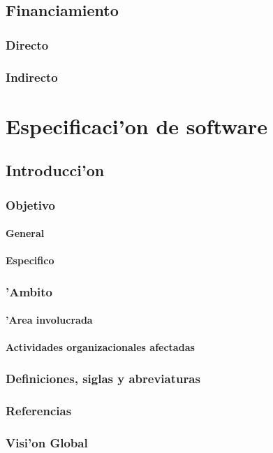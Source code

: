 \documentclass[letterpaper,openright,10pt,oneside]{report}
\begin{document}
	\chapter{Financiamiento}
		\section{Directo}
		\section{Indirecto}
\part{Especificaci'on de software}
	\chapter{Introducci'on}
		\section{Objetivo}
			\subsection{General}
			\subsection{Especifico}
		\section{'Ambito}
			\subsection{'Area involucrada}
			\subsection{Actividades organizacionales afectadas}
		\section{Definiciones, siglas y abreviaturas}
		\section{Referencias}
		\section{Visi'on Global}
\end{document}
